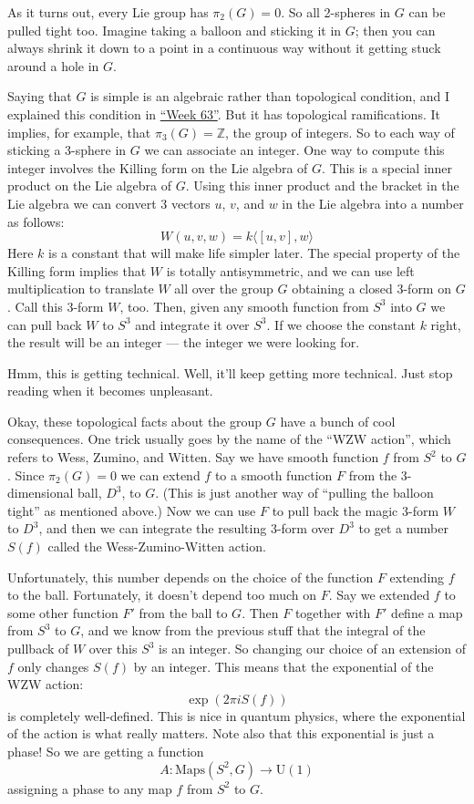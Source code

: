\documentclass{article}
\begin{document}
As it turns out, every Lie group has \(\pi_2(G) = 0\). So all 2-spheres
in \(G\) can be pulled tight too. Imagine taking a balloon and sticking
it in \(G\); then you can always shrink it down to a point in a
continuous way without it getting stuck around a hole in \(G\).

Saying that \(G\) is simple is an algebraic rather than topological
condition, and I explained this condition in
\protect\hyperlink{week63}{``Week 63''}. But it has topological
ramifications. It implies, for example, that \(\pi_3(G) = \mathbb{Z}\),
the group of integers. So to each way of sticking a 3-sphere in \(G\) we
can associate an integer. One way to compute this integer involves the
Killing form on the Lie algebra of \(G\). This is a special inner
product on the Lie algebra of \(G\). Using this inner product and the
bracket in the Lie algebra we can convert 3 vectors \(u\), \(v\), and
\(w\) in the Lie algebra into a number as follows:
\[W(u,v,w) = k \langle [u,v],w \rangle\] Here \(k\) is a constant that
will make life simpler later. The special property of the Killing form
implies that \(W\) is totally antisymmetric, and we can use left
multiplication to translate \(W\) all over the group \(G\) obtaining a
closed \(3\)-form on \(G\). Call this \(3\)-form \(W\), too. Then, given
any smooth function from \(S^3\) into \(G\) we can pull back \(W\) to
\(S^3\) and integrate it over \(S^3\). If we choose the constant \(k\)
right, the result will be an integer --- the integer we were looking
for.

Hmm, this is getting technical. Well, it'll keep getting more technical.
Just stop reading when it becomes unpleasant.

Okay, these topological facts about the group \(G\) have a bunch of cool
consequences. One trick usually goes by the name of the ``WZW action'',
which refers to Wess, Zumino, and Witten. Say we have smooth function
\(f\) from \(S^2\) to \(G\). Since \(\pi_2(G) = 0\) we can extend \(f\)
to a smooth function \(F\) from the \(3\)-dimensional ball, \(D^3\), to
\(G\). (This is just another way of ``pulling the balloon tight'' as
mentioned above.) Now we can use \(F\) to pull back the magic \(3\)-form
\(W\) to \(D^3\), and then we can integrate the resulting \(3\)-form
over \(D^3\) to get a number \(S(f)\) called the Wess-Zumino-Witten
action.

Unfortunately, this number depends on the choice of the function \(F\)
extending \(f\) to the ball. Fortunately, it doesn't depend too much on
\(F\). Say we extended \(f\) to some other function \(F'\) from the ball
to \(G\). Then \(F\) together with \(F'\) define a map from \(S^3\) to
\(G\), and we know from the previous stuff that the integral of the
pullback of \(W\) over this \(S^3\) is an integer. So changing our
choice of an extension of \(f\) only changes \(S(f)\) by an integer.
This means that the exponential of the WZW action:
\[\exp(2 \pi i S(f))\] is completely well-defined. This is nice in
quantum physics, where the exponential of the action is what really
matters. Note also that this exponential is just a phase! So we are
getting a function \[A\colon\mathrm{Maps}(S^2,G)\to \mathrm{U}(1)\]
assigning a phase to any map \(f\) from \(S^2\) to \(G\).
\end{document}
